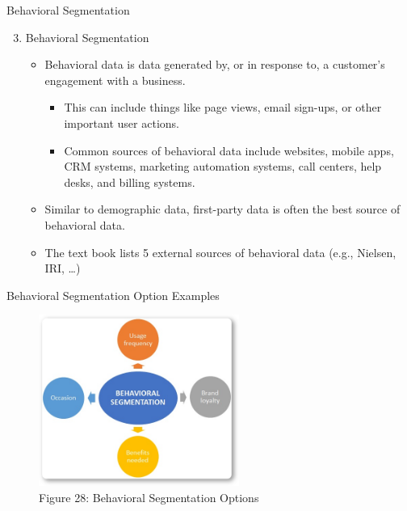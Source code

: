 \documentclass[pdf]{beamer}
\theoremstyle{remark}
\theoremstyle{definition}
\begin{document}
\begin{frame}[t]{Behavioral Segmentation}
\begin{enumerate}
 \setcounter{enumi}{2}
 \item Behavioral Segmentation
  \begin{itemize}
    \item Behavioral data is data generated by, or in response to, a customer's engagement with a business. 
    \begin{itemize}
      \item This can include things like page views, email sign-ups, or other important user actions. 
      \item Common sources of behavioral data include websites, mobile apps, CRM systems, marketing automation systems, call centers, help desks, and billing systems.
    \end{itemize}
    \item Similar to demographic data, first-party data is often the best source of behavioral data.
    \item The text book lists 5 external sources of behavioral data (e.g., Nielsen, IRI, \ldots)
  \end{itemize}
\end{enumerate}
\end{frame}

\begin{frame}[t]{Behavioral Segmentation Option Examples}
\begin{figure}[htbp]
  \captionsetup{justification=centering}
  \includegraphics[height=5.6cm, trim=0.0cm 0.0cm 0.0cm 0.0cm width=5.6cm]{Images/Behavioral_Segmentation.png}
  \caption{Figure {\color{franklinblue} 28}: Behavioral Segmentation Options}
\end{figure}
\end{frame}
\end{document}
